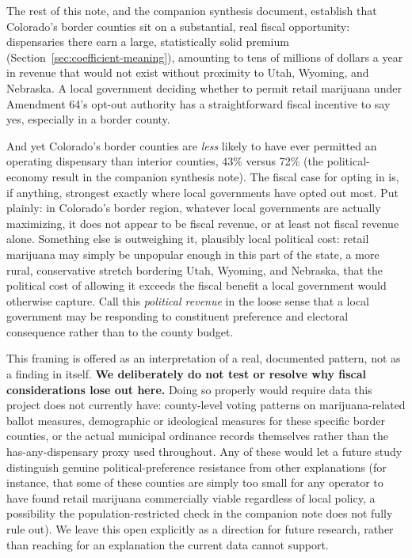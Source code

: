 \documentclass[11pt]{article}
\begin{document}
The rest of this note, and the companion synthesis document, establish that Colorado's border counties
sit on a substantial, real fiscal opportunity: dispensaries there earn a large, statistically solid
premium (Section~\ref{sec:coefficient-meaning}), amounting to tens of millions of dollars a year in
revenue that would not exist without proximity to Utah, Wyoming, and Nebraska. A local government
deciding whether to permit retail marijuana under Amendment 64's opt-out authority has a straightforward
fiscal incentive to say yes, especially in a border county.

And yet Colorado's border counties are \emph{less} likely to have ever permitted an operating dispensary
than interior counties, 43\% versus 72\% (the political-economy result in the companion synthesis note).
The fiscal case for opting in is, if anything, strongest exactly where local governments have opted out
most. Put plainly: in Colorado's border region, whatever local governments are actually maximizing, it
does not appear to be fiscal revenue, or at least not fiscal revenue alone. Something else is outweighing
it, plausibly local political cost: retail marijuana may simply be unpopular enough in this part of the
state, a more rural, conservative stretch bordering Utah, Wyoming, and Nebraska, that the political cost
of allowing it exceeds the fiscal benefit a local government would otherwise capture. Call this
\emph{political revenue} in the loose sense that a local government may be responding to constituent
preference and electoral consequence rather than to the county budget.

This framing is offered as an interpretation of a real, documented pattern, not as a finding in itself.
\textbf{We deliberately do not test or resolve why fiscal considerations lose out here.} Doing so
properly would require data this project does not currently have: county-level voting patterns on
marijuana-related ballot measures, demographic or ideological measures for these specific border
counties, or the actual municipal ordinance records themselves rather than the has-any-dispensary proxy
used throughout. Any of these would let a future study distinguish genuine political-preference resistance
from other explanations (for instance, that some of these counties are simply too small for any operator
to have found retail marijuana commercially viable regardless of local policy, a possibility the
population-restricted check in the companion note does not fully rule out). We leave this open explicitly
as a direction for future research, rather than reaching for an explanation the current data cannot
support.
\end{document}
